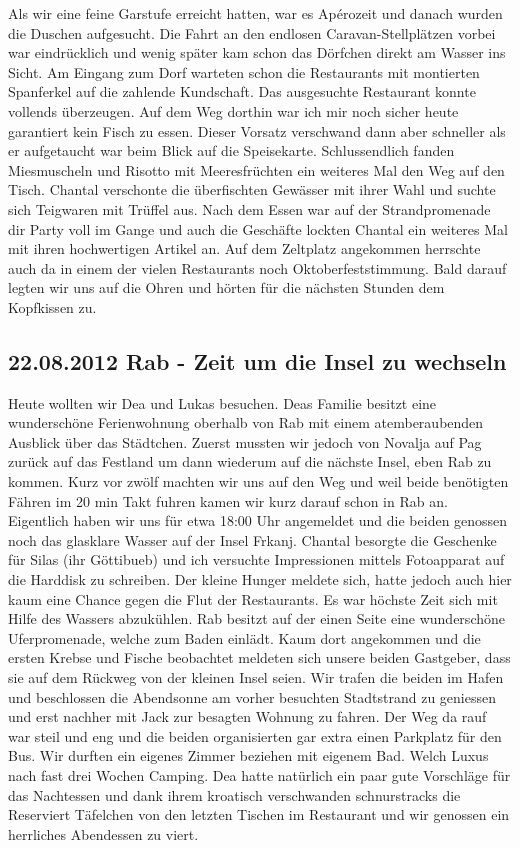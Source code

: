 Als wir eine feine Garstufe erreicht hatten, war es Apérozeit und danach wurden die Duschen aufgesucht.
Die Fahrt an den endlosen Caravan-Stellplätzen vorbei war eindrücklich und wenig später kam schon das Dörfchen direkt am Wasser ins Sicht.
Am Eingang zum Dorf warteten schon die Restaurants mit montierten Spanferkel auf die zahlende Kundschaft.
Das ausgesuchte Restaurant konnte vollends überzeugen.
Auf dem Weg dorthin war ich mir noch sicher heute garantiert kein Fisch zu essen.
Dieser Vorsatz verschwand dann aber schneller als er aufgetaucht war beim Blick auf die Speisekarte.
Schlussendlich fanden Miesmuscheln und Risotto mit Meeresfrüchten ein weiteres Mal den Weg auf den Tisch.
Chantal verschonte die überfischten Gewässer mit ihrer Wahl und suchte sich Teigwaren mit Trüffel aus.
Nach dem Essen war auf der Strandpromenade dir Party voll im Gange und auch die Geschäfte lockten Chantal ein weiteres Mal mit ihren hochwertigen Artikel an.
Auf dem Zeltplatz angekommen herrschte auch da in einem der vielen Restaurants noch Oktoberfeststimmung.
Bald darauf legten wir uns auf die Ohren und hörten für die nächsten Stunden dem Kopfkissen zu.

\subsection{22.08.2012 Rab - Zeit um die Insel zu wechseln}
Heute wollten wir Dea und Lukas besuchen.
Deas Familie besitzt eine wunderschöne Ferienwohnung oberhalb von Rab mit einem atemberaubenden Ausblick über das Städtchen.
Zuerst mussten wir jedoch von Novalja auf Pag zurück auf das Festland um dann wiederum auf die nächste Insel, eben Rab zu kommen.
Kurz vor zwölf machten wir uns auf den Weg und weil beide benötigten Fähren im 20 min Takt fuhren kamen wir kurz darauf schon in Rab an.
Eigentlich haben wir uns für etwa 18:00 Uhr angemeldet und die beiden genossen noch das glasklare Wasser auf der Insel Frkanj.
Chantal besorgte die Geschenke für Silas (ihr Göttibueb) und ich versuchte Impressionen mittels Fotoapparat auf die Harddisk zu schreiben.
Der kleine Hunger meldete sich, hatte jedoch auch hier kaum eine Chance gegen die Flut der Restaurants.
Es war höchste Zeit sich mit Hilfe des Wassers abzukühlen.
Rab besitzt auf der einen Seite eine wunderschöne Uferpromenade, welche zum Baden einlädt. Kaum dort angekommen und die ersten Krebse
und Fische beobachtet meldeten sich unsere beiden Gastgeber, dass sie auf dem Rückweg von der kleinen Insel seien.
Wir trafen die beiden im Hafen und beschlossen die Abendsonne am vorher besuchten Stadtstrand zu geniessen und erst nachher mit Jack zur besagten Wohnung zu fahren.
Der Weg da rauf war steil und eng und die beiden organisierten gar extra einen Parkplatz für den Bus.
Wir durften ein eigenes Zimmer beziehen mit eigenem Bad.
Welch Luxus nach fast drei Wochen Camping.
Dea hatte natürlich ein paar gute Vorschläge für das Nachtessen und dank ihrem kroatisch verschwanden schnurstracks die \glqq Reserviert \grqq Täfelchen von den letzten Tischen im Restaurant und wir genossen ein herrliches Abendessen zu viert.


